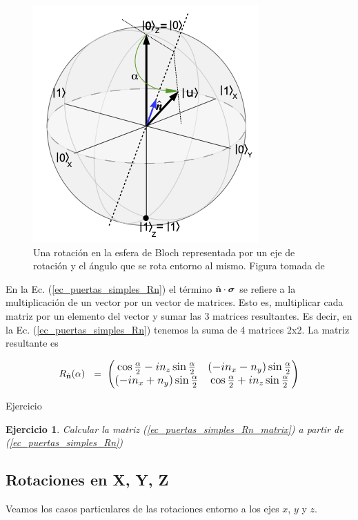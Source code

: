 \documentclass[a4paper,11pt]{book} %
\newtheorem{ejercicio_contador}{Ejercicio}
\newcommand{\Ejercicio}[1]{
		\begin{mybox_gray}{Ejercicio} 
			\begin{ejercicio_contador}
				 #1 
			\end{ejercicio_contador} 
		\end{mybox_gray}
	}
\numberwithin{equation}{chapter}
\def\lp{\left(}
\def\rp{\right)}
\begin{document}
	\begin{figure}[H]
	\centering 
	\includegraphics[width=0.3\linewidth]{Figuras/Fig_puertas_simples_BlochSphere_rot.png}
	\caption{Una rotación en la esfera de Bloch representada por un eje de rotación y el ángulo que se rota entorno al mismo. Figura tomada de \cite{bib_Curso-JMas}}
	\label{Fig_puertas_simples_BlochSphere_rot.png}
	\end{figure}

En la Ec. (\ref{ec_puertas_simples_Rn}) el término $\hat{\bf n}\cdot \boldsymbol{\sigma}$ se refiere a la multiplicación de un vector por un vector de matrices. Esto es, multiplicar cada matriz por un elemento del vector y sumar las 3 matrices resultantes. Es decir, en la Ec. (\ref{ec_puertas_simples_Rn}) tenemos la suma de 4 matrices 2x2. La matriz resultante es
	
	\begin{equation} \label{ec_puertas_simples_Rn_matrix}
	R_{\hat{\bf n}}(\alpha)~  ~=~ \large{\lp \begin{matrix} 
	\cos \frac{\alpha}{2} - i n_z\sin\frac{\alpha}{2} 
	& (-in_x- n_y)\sin\frac{\alpha}{2} \\ 
	(-in_x + n_y) \sin\frac{\alpha}{2} 
	&  \cos \frac{\alpha}{2} + i n_z\sin\frac{\alpha}{2} 
	\end{matrix} \rp}
	\end{equation}
			

\Ejercicio{
Calcular la matriz (\ref{ec_puertas_simples_Rn_matrix}) a partir de (\ref{ec_puertas_simples_Rn})
}

        \subsection{Rotaciones en X, Y, Z}

Veamos los casos particulares de las rotaciones entorno a los ejes $x$, $y$ y $z$.        
        
\end{document}
